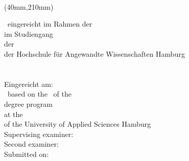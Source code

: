 \title{\Title}   				%
\author{\TheStudent}		%

\newpage
\thispagestyle{empty}

{
\hfuzz=20pt					%
\selectfont

\vspace*{1cm}
\begin{minipage}[b]{\textwidth}
	\begin{center}
		\fontsize{14pt}{20pt}\selectfont
		\TheStudent \\[1.5cm]
		\fontsize{18pt}{20pt}\selectfont
		\Title
	\end{center}
\end{minipage}

\begin{textblock*}{\textwidth}(40mm,210mm)
	\begin{minipage}[b]{\textwidth}
		\fontsize{12pt}{14pt}\selectfont
		\DE
		{
			\ThesisKind\ eingereicht im Rahmen der \ExamKind \\	
			im Studiengang \textit{\DegreeName} \\
			der \FacultyDE \\
			der Hochschule für Angewandte Wissenschaften Hamburg\\[1em]
			 \TheSupervisor \\
			 \TheSecondExaminer \\[1em]
			Eingereicht am: \DateOfSubmission \\
		}
		{
			\ThesisKind\ based on the \ExamKind\ of the\\
			degree program \textit{\DegreeName} \\
			at the \FacultyEN \\
			of the University of Applied Sciences Hamburg\\[1em]
			Supervising examiner: \TheSupervisor \\
			Second examiner: \TheSecondExaminer \\[1em]
			Submitted on: \DateOfSubmission \\
		}
	\end{minipage}
\end{textblock*}
}
